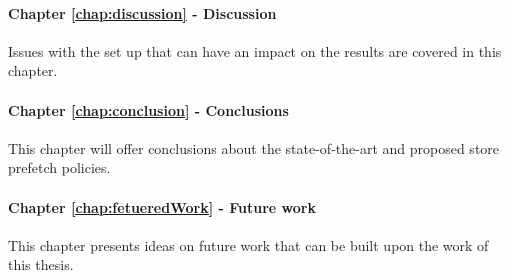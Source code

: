 \paragraph{Chapter \ref{chap:discussion} - Discussion} Issues with the set up that can have an impact on the results are covered in this chapter.
\paragraph{Chapter \ref{chap:conclusion} - Conclusions} This chapter will offer conclusions about the state-of-the-art and proposed store prefetch policies.
\paragraph{Chapter \ref{chap:fetueredWork} - Future work} This chapter presents ideas on future work that can be
built upon the work of this thesis.
